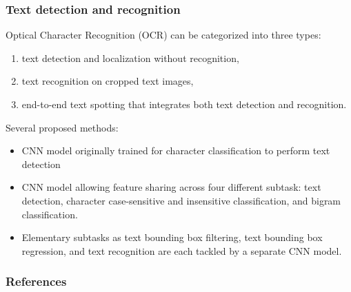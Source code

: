 \begin{frame}
	\frametitle{Text detection and recognition}


	Optical Character Recognition (OCR) can be categorized into three types:
	\begin{enumerate}
		\item text detection and localization without recognition,
		\item text recognition on cropped text images,
		\item  end-to-end text spotting that integrates both text detection and recognition.
	\end{enumerate}

	\bigskip

	Several proposed methods:

	\begin{itemize}
		\item CNN model originally trained for character classification to perform text detection


		\item CNN model allowing feature sharing across four different subtask: text detection, character case-sensitive and insensitive classification, and bigram classification.


		\item Elementary subtasks as text bounding box filtering, text bounding box regression, and text recognition are each tackled by a separate CNN model.

	\end{itemize}

\end{frame}











\begin{frame}[allowframebreaks]
	\frametitle{References}
\printbibliography
\end{frame}








